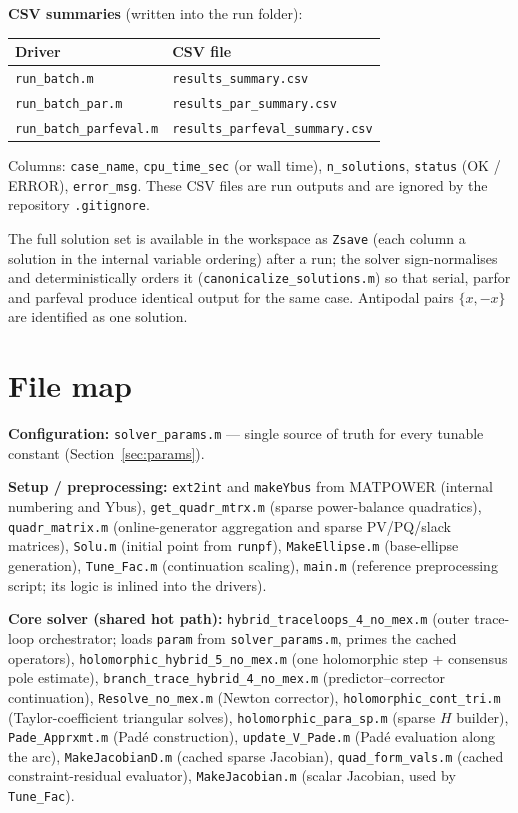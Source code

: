 \documentclass[11pt,a4paper]{article}
\newcommand{\code}[1]{\texttt{#1}}
\begin{document}
\textbf{CSV summaries} (written into the run folder):
\begin{center}\small
\begin{tabular}{@{}ll@{}}
\toprule
Driver & CSV file\\
\midrule
\code{run_batch.m}          & \code{results_summary.csv}\\
\code{run_batch_par.m}      & \code{results_par_summary.csv}\\
\code{run_batch_parfeval.m} & \code{results_parfeval_summary.csv}\\
\bottomrule
\end{tabular}
\end{center}
Columns: \code{case_name}, \code{cpu_time_sec} (or wall time), \code{n_solutions},
\code{status} (OK / ERROR), \code{error_msg}.
These CSV files are run outputs and are ignored by the repository \code{.gitignore}.

The full solution set is available in the workspace as \code{Zsave} (each column a
solution in the internal variable ordering) after a run; the solver sign-normalises and
deterministically orders it (\code{canonicalize_solutions.m}) so that serial, parfor and
parfeval produce identical output for the same case. Antipodal pairs $\{x,-x\}$ are
identified as one solution.



\section{File map}

\textbf{Configuration:} \code{solver_params.m} --- single source of truth for every
tunable constant (Section~\ref{sec:params}).

\textbf{Setup / preprocessing:}
\code{ext2int} and \code{makeYbus} from MATPOWER (internal numbering and Ybus),
\code{get_quadr_mtrx.m} (sparse power-balance quadratics),
\code{quadr_matrix.m} (online-generator aggregation and sparse PV/PQ/slack matrices),
\code{Solu.m} (initial point from
\code{runpf}), \code{MakeEllipse.m} (base-ellipse generation), \code{Tune_Fac.m}
(continuation scaling), \code{main.m} (reference preprocessing script; its logic is
inlined into the drivers).

\textbf{Core solver (shared hot path):}
\code{hybrid_traceloops_4_no_mex.m} (outer trace-loop orchestrator; loads \code{param}
from \code{solver_params.m}, primes the cached operators), \code{holomorphic_hybrid_5_no_mex.m} (one
holomorphic step + consensus pole estimate), \code{branch_trace_hybrid_4_no_mex.m}
(predictor--corrector continuation), \code{Resolve_no_mex.m} (Newton corrector),
\code{holomorphic_cont_tri.m} (Taylor-coefficient triangular solves),
\code{holomorphic_para_sp.m} (sparse $H$ builder), \code{Pade_Apprxmt.m} (Pad\'e
construction), \code{update_V_Pade.m} (Pad\'e evaluation along the arc),
\code{MakeJacobianD.m} (cached sparse Jacobian), \code{quad_form_vals.m} (cached
constraint-residual evaluator), \code{MakeJacobian.m} (scalar Jacobian, used by
\code{Tune_Fac}).
\end{document}
